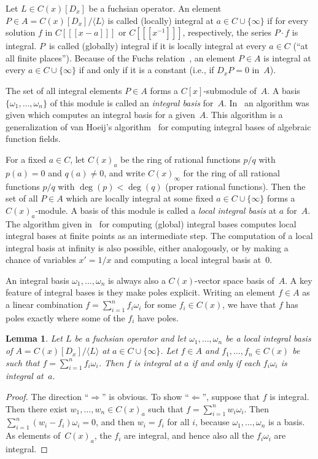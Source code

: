 \documentclass{sig-alternate}
\newtheorem{lemma}[theorem]{Lemma}
\def\<#1>{\langle#1\rangle}
\begin{document}
Let $L\in C(x)[D_x]$ be a fuchsian operator. An element $P\in A=C(x)[D_x]/\<L>$
is called (locally) integral at $a\in C\cup\{\infty\}$ if for every solution $f$
in $C[[[x-a]]]$ or $C[[[x^{-1}]]]$, respectively, the series $P\cdot f$ is
integral. $P$~is called (globally) integral if it is locally integral at every
$a\in C$ (``at all finite places''). Because of the Fuchs relation~\cite{..}, an
element $P\in A$ is integral at every $a\in C\cup\{\infty\}$ if and only if it
is a constant (i.e., if $D_xP=0$ in~$A$).

The set of all integral elements $P\in A$ forms a $C[x]$-submodule of~$A$.
A basis $\{\omega_1,\dots,\omega_n\}$ of this module is called an \emph{integral basis}
for~$A$. In~\cite{..} an algorithm was given which computes an integral basis
for a given~$A$. This algorithm is a generalization of van Hoeij's
algorithm~\cite{..} for computing integral bases of algebraic function
fields.

For a fixed $a\in C$, let $C(x)_a$ be the ring of rational functions $p/q$
with $p(a)=0$ and $q(a)\neq0$, and write $C(x)_\infty$ for the ring of all
rational functions $p/q$ with $\deg(p)<\deg(q)$ (proper rational
functions). Then the set of all $P\in A$ which are locally integral at some
fixed $a\in C\cup\{\infty\}$ forms a $C(x)_a$-module. A basis of this module is
called a \emph{local integral basis} at $a$ for~$A$. The algorithm given in~\cite{..}
for computing (global) integral bases computes local integral bases at finite
points as an intermediate step. The computation of a local integral basis at
infinity is also possible, either analogously, or by making a chance of
variables $x'=1/x$ and computing a local integral basis at~$0$.

An integral basis $\omega_1,\dots,\omega_n$ is always also a $C(x)$-vector space
basis of~$A$. A key feature of integral bases is they make poles explicit. Writing
an element $f\in A$ as a linear combination $f=\sum_{i=1}^n f_i\omega_i$ for some
$f_i\in C(x)$, we have that $f$ has poles exactly where some of the $f_i$ have
poles.

\begin{lemma}\label{lemma:1}
  Let $L$ be a fuchsian operator and let
  $\omega_1,\dots,\omega_n$ be a local integral basis of $A=C(x)[D_x]/\<L>$ at $a\in C\cup\{\infty\}$.
  Let $f\in A$ and $f_1,\dots,f_n\in C(x)$ be such that $f=\sum_{i=1}^nf_i\omega_i$.
  Then $f$ is integral at $a$ if and only if each $f_i\omega_i$ is integral at~$a$.
\end{lemma}
\begin{proof}
  The direction ``$\Rightarrow$'' is obvious. To show ``$\Leftarrow$'', suppose
  that $f$ is integral. Then there exist $w_1,\dots,w_n\in C(x)_a$ such that
  $f=\sum_{i=1}^nw_i\omega_i$. Then $\sum_{i=1}^n(w_i-f_i)\omega_i=0$, and then
  $w_i=f_i$ for all $i$, because $\omega_1,\dots,\omega_n$ is a basis.
  As elements of~$C(x)_a$, the $f_i$ are integral, and hence also all the $f_i\omega_i$
  are integral.
\end{proof}
\end{document}
